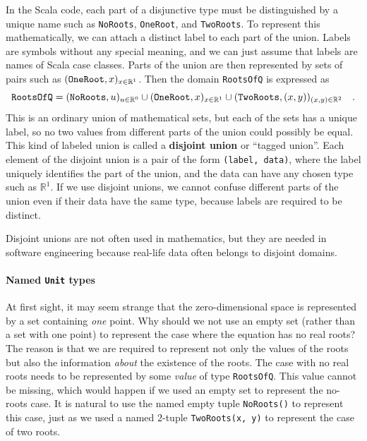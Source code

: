 In the Scala code, each part of a disjunctive type must be distinguished
by a unique name such as \lstinline!NoRoots!, \lstinline!OneRoot!,
and \lstinline!TwoRoots!. To represent this mathematically, we can
attach a distinct label to each part of the union. Labels are symbols
without any special meaning, and we can just assume that labels are
names of Scala case classes. Parts of the union are then represented
by sets of pairs such as $(\text{\texttt{OneRoot}},x)_{x\in\mathbb{R}^{1}}$.
Then the domain \lstinline!RootsOfQ! is expressed as
\[
\text{\texttt{RootsOfQ}}=(\text{\texttt{NoRoots}},u)_{u\in\mathbb{R}^{0}}\cup(\text{\texttt{OneRoot}},x)_{x\in\mathbb{R}^{1}}\cup(\text{\texttt{TwoRoots}},\left(x,y\right))_{\left(x,y\right)\in\mathbb{R}^{2}}\quad.
\]
This is an ordinary union of mathematical sets, but each of the sets
has a unique label, so no two values from different parts of the union
could possibly be equal. This kind of labeled union is called a \textbf{disjoint
union} or ``tagged union''. Each element of the disjoint union is
a pair of the form \lstinline!(label, data)!, where the label uniquely
identifies the part of the union, and the data can have any chosen
type such as $\mathbb{R}^{1}$. If we use disjoint unions, we cannot
confuse different parts of the union even if their data have the same
type, because labels are required to be distinct.

Disjoint unions are not often used in mathematics, but they are needed
in software engineering because real-life data often belongs to disjoint
domains.

\paragraph{Named \texttt{Unit} types}

At first sight, it may seem strange that the zero-dimensional space
is represented by a set containing \emph{one} point. Why should we
not use an empty set (rather than a set with one point) to represent
the case where the equation has no real roots? The reason is that
we are required to represent not only the values of the roots but
also the information \emph{about} the existence of the roots. The
case with no real roots needs to be represented by some \emph{value}
of type \lstinline!RootsOfQ!. This value cannot be missing, which
would happen if we used an empty set to represent the no-roots case.
It is natural to use the named empty tuple \lstinline!NoRoots()!
to represent this case, just as we used a named $2$-tuple \lstinline!TwoRoots(x, y)!
to represent the case of two roots.

